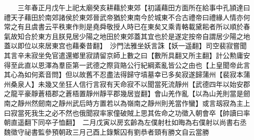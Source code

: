 　　三年春正月戊午上祀太廟癸亥耕藉於東郊【初議藉田方面所在給事中孔頴達曰禮天子藉田於南郊諸侯於東郊晉武帝猶於東南今於城東不合古禮帝曰禮緣人情亦何常之有且虞書云平秩東作則是堯舜敬授人時已在東矣又乘青輅載黛耜者所以順於春氣故知合於東方且朕見居少陽之地田於東郊蓋其宜也於是遂定按帝自謂居少陽之地蓋以即位以來居東宫也藉秦昔翻】　沙門法雅坐妖言誅【妖一遥翻】司空裴寂嘗聞其言辛未寂坐免官遣還鄉里寂請留京師上數之曰【數所具翻又所主翻】計公勲庸安得至此直以恩澤為羣臣第一武德之際貨賂公行紀綱紊亂皆公之由也【上皇聞帝此言其心為如何紊音問】但以故舊不忍盡法得歸守墳墓幸已多矣寂遂歸蒲州【裴寂本蒲州桑泉人】未幾又坐狂人信行言寂有天命寂不以聞當死流靜州【武德四年以始安郡之龍平豪靜蒼梧郡之蒼梧置靜州靜平郡幾居豈翻】會山羌作亂【以為山羌則當是劒南之靜州然劒南之靜州武后時方置若以為嶺南之靜州則羌當作蠻】或言刼寂為主上曰寂當死我生之必不然也俄聞寂率家僮破賊上思其佐命之功徵入朝會卒【帥讀曰率朝直遥翻下同卒子恤翻】　二月戊寅以房玄齡為左僕射杜如晦為右僕射以尚書右丞魏徵守祕書監參預朝政三月己酉上錄繫囚有劉恭者頸有勝文自云當勝

